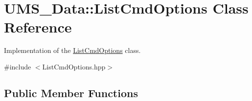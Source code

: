 \hypertarget{classUMS__Data_1_1ListCmdOptions}{
\section{UMS\_\-Data::ListCmdOptions Class Reference}
\label{classUMS__Data_1_1ListCmdOptions}
}


Implementation of the \hyperlink{classUMS__Data_1_1ListCmdOptions}{ListCmdOptions} class.  




{\ttfamily \#include $<$ListCmdOptions.hpp$>$}

\subsection*{Public Member Functions}
